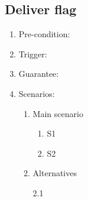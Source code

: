 \documentclass[a4paper,twoside,11pt]{article}
\begin{document}
\subsection*{Deliver flag}
\begin{enumerate}
\item Pre-condition: 
\item Trigger:
\item Guarantee:
\item Scenarios: 
	\begin{enumerate}
	\item Main scenario
		\begin{enumerate}[1)]
		\item S1
		\item S2
		\end{enumerate}
	\item Alternatives
		\begin{description}
		\item[2.1]
		\end{description}
	\end{enumerate}
\end{enumerate}
\end{document}
